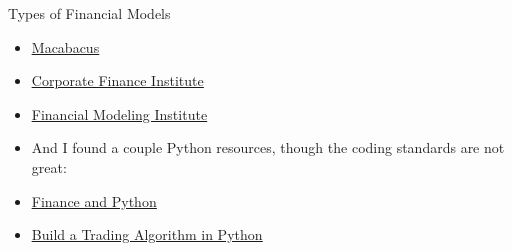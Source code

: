 \documentclass[handout, 11pt]{beamer}
\begin{document}
\begin{section}{Types of Financial Models}
\begin{frame}
\begin{itemize}
\vfill
\item \textcolor{blue}{\underline{\href{http://macabacus.com/learn}{Macabacus}}}
\vfill
\item \textcolor{blue}{\underline{\href{https://corporatefinanceinstitute.com/resources/knowledge/modeling/}{Corporate Finance Institute}}}
\vfill
\item \textcolor{blue}{\underline{\href{https://fminstitute.com/learning/}{Financial Modeling Institute}}}
\vfill
\item And I found a couple Python resources, though the coding standards are not great:
\vfill
\item \textcolor{blue}{\underline{\href{http://www.financeandpython.com/Finance.html}{Finance and Python}}}
\vfill
\item \textcolor{blue}{\underline{\href{https://www.datacamp.com/community/tutorials/finance-python-trading}{Build a Trading Algorithm in Python}}}
\end{itemize}
\end{frame}
\end{section}
\end{document}
